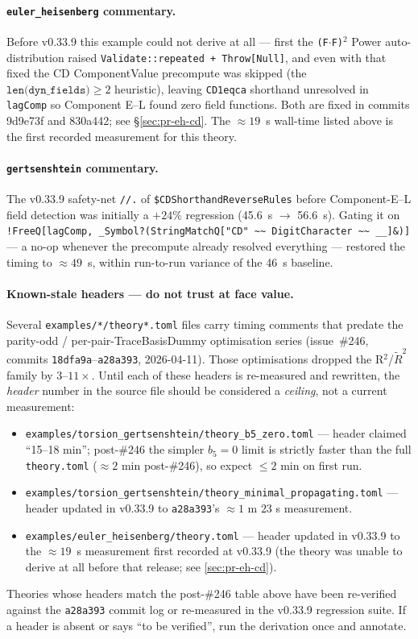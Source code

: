 \paragraph{\texttt{euler\_heisenberg} commentary.} Before v0.33.9 this example could not derive at all --- first the \texttt{(F$\cdot$F)}$^2$ Power auto-distribution raised \verb|Validate::repeated + Throw[Null]|, and even with that fixed the CD ComponentValue precompute was skipped (the $\texttt{len(dyn\_fields)} \ge 2$ heuristic), leaving \verb|CD1eqca| shorthand unresolved in \verb|lagComp| so Component E--L found zero field functions. Both are fixed in commits 9d9e73f and 830a442; see \S\ref{sec:pr-eh-cd}. The $\approx 19$~s wall-time listed above is the first recorded measurement for this theory.

\paragraph{\texttt{gertsenshtein} commentary.} The v0.33.9 safety-net \verb|//.| of \verb|$CDShorthandReverseRules| before Component-E--L field detection was initially a $+24\%$ regression (45.6~s $\rightarrow$ 56.6~s). Gating it on \verb|!FreeQ[lagComp, _Symbol?(StringMatchQ["CD" ~~ DigitCharacter ~~ __]&)]| --- a no-op whenever the precompute already resolved everything --- restored the timing to $\approx 49$~s, within run-to-run variance of the 46~s baseline.

\paragraph{Known-stale headers --- do not trust at face value.} Several \texttt{examples/*/theory*.toml} files carry timing comments that predate the parity-odd / per-pair-TraceBasisDummy optimisation series (issue~\#246, commits \texttt{18dfa9a}--\texttt{a28a393}, 2026-04-11). Those optimisations dropped the R$^2$/\(\tilde{R}^2\) family by $3\text{--}11\times$. Until each of these headers is re-measured and rewritten, the \emph{header} number in the source file should be considered a \emph{ceiling}, not a current measurement:
\begin{itemize}
  \item \texttt{examples/torsion\_gertsenshtein/theory\_b5\_zero.toml} --- header claimed ``15--18 min''; post-\#246 the simpler $b_5 = 0$ limit is strictly faster than the full \texttt{theory.toml} ($\approx 2$ min post-\#246), so expect $\le 2$ min on first run.
  \item \texttt{examples/torsion\_gertsenshtein/theory\_minimal\_propagating.toml} --- header updated in v0.33.9 to \texttt{a28a393}'s $\approx 1$ m $23$ s measurement.
  \item \texttt{examples/euler\_heisenberg/theory.toml} --- header updated in v0.33.9 to the $\approx 19$~s measurement first recorded at v0.33.9 (the theory was unable to derive at all before that release; see \cref{sec:pr-eh-cd}).
\end{itemize}
Theories whose headers match the post-\#246 table above have been re-verified against the \texttt{a28a393} commit log or re-measured in the v0.33.9 regression suite. If a header is absent or says ``to be verified'', run the derivation once and annotate.

